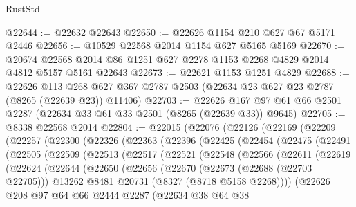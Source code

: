 \begin{lexlean}{RustStd}
\begin{coremodule}
@22644 := @22632 @22643
@22650 := @22626 @1154 @210 @627 @67 @5171 @2446
@22656 := @10529 @22568 @2014 @1154 @627 @5165 @5169
@22670 := @20674 @22568 @2014 @86 @1251 @627 @2278 @1153 @2268 @4829 @2014 @4812 @5157 @5161 @22643
@22673 := @22621 @1153 @1251 @4829
@22688 := @22626
    @113
    @268
    @627
    @367
    @2787
    @2503
    (@22634 @23 @627 @23 @2787 (@8265 (@22639 @23)) @11406)
@22703 := @22626 @167 @97 @61 @66 @2501 @2287 (@22634 @33 @61 @33 @2501 (@8265 (@22639 @33)) @9645)
@22705 := @8338 @22568 @2014
@22804 := @22015
    (@22076
      (@22126
        (@22169
          (@22209
            (@22257
              (@22300
                (@22326
                  (@22363
                    (@22396
                      (@22425
                        (@22454
                          (@22475
                            (@22491
                              (@22505
                                (@22509
                                  (@22513
                                    (@22517
                                      (@22521
                                        (@22548
                                          (@22566
                                            (@22611
                                              (@22619
                                                (@22624
                                                  (@22644
                                                    (@22650
                                                      (@22656
                                                        (@22670
                                                          (@22673 (@22688 (@22703 @22705)))
                                                          @13262
                                                          @8481
                                                          @20731
                                                          (@8327 (@8718 @5158 @2268))))
                                                      (@22626
                                                        @208
                                                        @97
                                                        @64
                                                        @66
                                                        @2444
                                                        @2287
                                                        (@22634
                                                          @38
                                                          @64
                                                          @38

\end{coremodule}
\end{lexlean}
